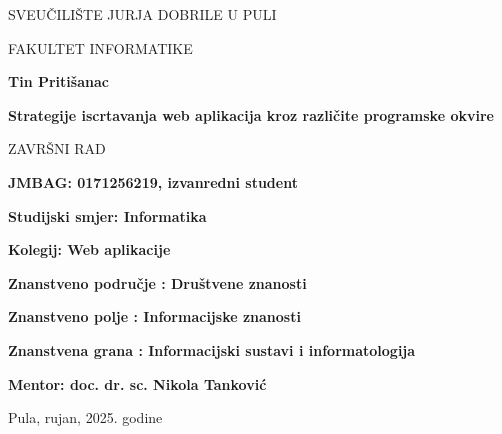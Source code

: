\begin{center}
SVEUČILIŠTE JURJA DOBRILE U PULI 

FAKULTET INFORMATIKE

\vspace{45mm} 

\textbf{Tin Pritišanac}

\vspace{20mm} 

\textbf{Strategije iscrtavanja web aplikacija
    kroz različite programske okvire}

\vspace{5mm}
ZAVRŠNI RAD

\end{center}

\vspace{45mm}

\textbf{JMBAG: 0171256219, izvanredni student}

\textbf{Studijski smjer: Informatika}
\bigskip

\textbf{Kolegij: \textbf{Web aplikacije} }

\textbf{Znanstveno područje : Društvene znanosti}

\textbf{Znanstveno polje : Informacijske znanosti}

\textbf{Znanstvena grana : Informacijski sustavi i informatologija}
\bigskip

\textbf{Mentor: doc. dr. sc. Nikola Tanković}

\vfill

\begin{center}

Pula, rujan, 2025. godine

\end{center}